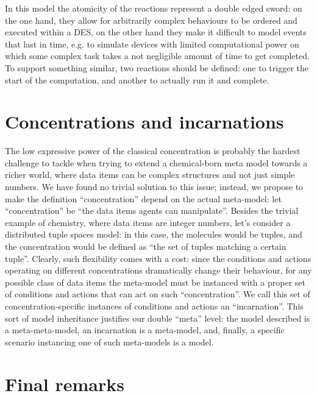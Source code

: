 \documentclass[12pt,a4paper,twoside,openright]{book}
\begin{document}
In this model the atomicity of the reactions represent a double edged sword: on the one hand, they allow for arbitrarily complex behaviours to be ordered and executed within a DES, on the other hand they make it difficult to model events that last in time, e.g. to simulate devices with limited computational power on which some complex task takes a not negligible amount of time to get completed.
%
To support something similar, two reactions should be defined: one to trigger the start of the computation, and another to actually run it and complete.

\section{Concentrations and incarnations}

The low expressive power of the classical concentration is probably the hardest challenge to tackle when trying to extend a chemical-born meta model towards a richer world, where data items can be complex structures and not just simple numbers.
%
We have found no trivial solution to this issue; instead, we propose to make the definition ``concentration'' depend on the actual meta-model: let ``concentration'' be ``the data items agents can manipulate''.
%
Besides the trivial example of chemistry, where data items are integer numbers, let's consider a distributed tuple spaces model: in this case, the molecules would be tuples, and the concentration would be defined as ``the set of tuples matching a certain tuple''.
%
Clearly, such flexibility comes with a cost: since the conditions and actions operating on different concentrations dramatically change their behaviour, for any possible class of data items the meta-model must be instanced with a proper set of conditions and actions that can act on such ``concentration''.
%
We call this set of concentration-specific instances of conditions and actions an ``incarnation''.
%
This sort of model inheritance justifies our double ``meta'' level: the model described is a meta-meta-model, an incarnation is a meta-model, and, finally, a specific scenario instancing one of such meta-models is a model.

\section{Final remarks}
\end{document}
